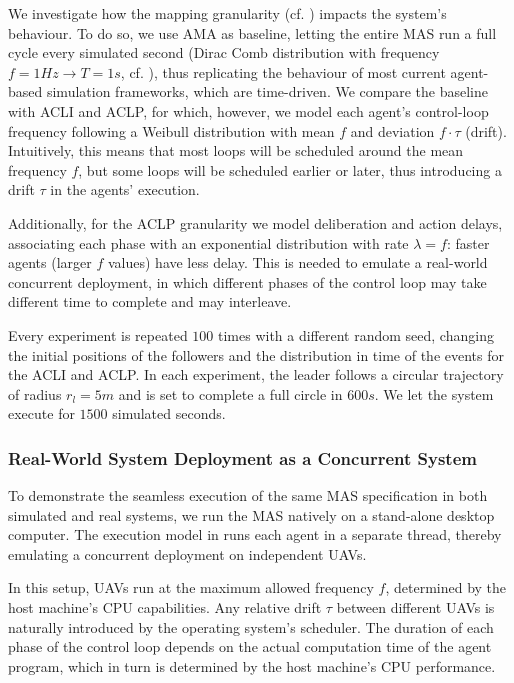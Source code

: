 We investigate how the mapping granularity (cf. ) impacts the system's behaviour.
%
To do so, we use \ac{AMA} as baseline,
letting the entire \ac{MAS} run a full cycle every simulated second
(Dirac Comb distribution with frequency $f=1Hz \rightarrow T=1s$, cf. ),
thus replicating the behaviour of most current agent-based simulation frameworks, which are time-driven.
%
We compare the baseline with \ac{ACLI} and \ac{ACLP},
for which, however, we model
each agent's control-loop frequency following a Weibull distribution with mean $f$ and deviation $f\cdot\tau$ (drift).
%
Intuitively, this means that most loops will be scheduled around the mean frequency $f$, but some loops will be scheduled earlier or later, thus introducing a drift $\tau$ in the agents' execution.

Additionally, for the \ac{ACLP} granularity we model deliberation and action delays,
associating each phase with an exponential distribution with rate $\lambda = f$:
faster agents (larger $f$ values) have less delay.
%
This is needed to emulate a real-world concurrent deployment, in which different phases of the control loop may take different time to complete and may interleave.

Every experiment is repeated $100$ times with a different random seed, changing
the initial positions of the followers
and the distribution in time of the events for the \ac{ACLI} and \ac{ACLP}.
%
In each experiment, the leader follows a circular trajectory of radius $r_l=5m$
and is set to complete a full circle in $600s$.
%
We let the system execute for $1500$ simulated seconds.



\subsubsection{Real-World System Deployment as a Concurrent System}
\label{ssec:real-world-execution}

To demonstrate the seamless execution of the same \ac{MAS}
specification in both simulated and real systems,
we run the \jakta{} \ac{MAS} natively on a stand-alone desktop computer.
%
The execution model in \jakta{} runs each agent in a separate thread,
thereby emulating a concurrent deployment on independent \acp{UAV}.

In this setup,
\acp{UAV} run at the maximum allowed frequency $f$,
determined by the host machine's CPU capabilities.
%
Any relative drift $\tau$ between different \acp{UAV}
is naturally introduced by the operating system's scheduler.
%
The duration of each phase of the control loop depends
on the actual computation time of the agent program,
which in turn is determined by the host machine's CPU performance.


